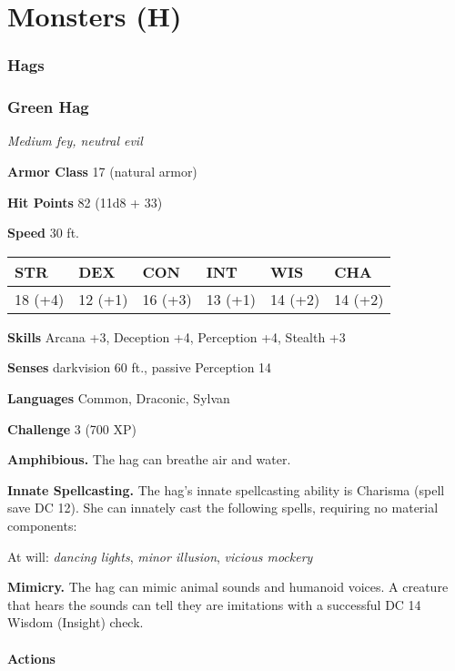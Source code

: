 \documentclass[
]{article}
\date{}
\begin{document}
\hypertarget{monsters-h}{%
\section{Monsters (H)}\label{monsters-h}}

\hypertarget{hags}{%
\subsubsection{Hags}\label{hags}}

\hypertarget{green-hag}{%
\subsubsection{Green Hag}\label{green-hag}}

\emph{Medium fey, neutral evil}

\textbf{Armor Class} 17 (natural armor)

\textbf{Hit Points} 82 (11d8 + 33)

\textbf{Speed} 30 ft.

\begin{longtable}[]{@{}llllll@{}}
\toprule
STR & DEX & CON & INT & WIS & CHA\tabularnewline
\midrule
\endhead
18 (+4) & 12 (+1) & 16 (+3) & 13 (+1) & 14 (+2) & 14 (+2)\tabularnewline
\bottomrule
\end{longtable}

\textbf{Skills} Arcana +3, Deception +4, Perception +4, Stealth +3

\textbf{Senses} darkvision 60 ft., passive Perception 14

\textbf{Languages} Common, Draconic, Sylvan

\textbf{Challenge} 3 (700 XP)

\textbf{Amphibious.} The hag can breathe air and water.

\textbf{Innate Spellcasting.} The hag's innate spellcasting ability is
Charisma (spell save DC 12). She can innately cast the following spells,
requiring no material components:

At will: \emph{dancing lights}, \emph{minor illusion}, \emph{vicious
mockery}

\textbf{Mimicry.} The hag can mimic animal sounds and humanoid voices. A
creature that hears the sounds can tell they are imitations with a
successful DC 14 Wisdom (Insight) check.

\hypertarget{actions}{%
\paragraph{Actions}\label{actions}}
\end{document}
